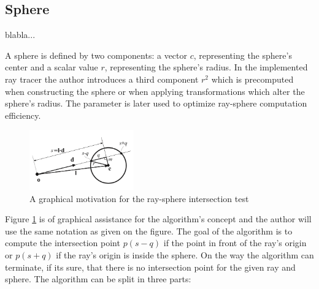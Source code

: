 \documentclass{article}
\begin{document}
\subsection{Sphere}

blabla...

\vspace*{\baselineskip}

A sphere is defined by two components: a vector $c$, representing the sphere's center and a scalar value $r$, representing the sphere's radius. In the implemented ray tracer the author introduces a third component $r^2$ which is precomputed when constructing the sphere or when applying transformations which alter the sphere's radius. The parameter is later used to optimize ray-sphere computation efficiency.

\begin{figure} 
    \centering
    \includegraphics[width=0.4\textwidth]{ray_sphere}
    \caption{A graphical motivation for the ray-sphere intersection test}
    \label{fig:raysphere}
\end{figure}

Figure \ref{fig:raysphere} is of graphical assistance for the algorithm's concept and the author will use the same notation as given on the figure. The goal of the algorithm is to compute the intersection point $p(s-q)$ if the point in front of the ray's origin or $p(s+q)$ if the ray's origin is inside the sphere. On the way the algorithm can terminate, if its sure, that there is no intersection point for the given ray and sphere. The algorithm can be split in three parts: \cite{realtime_ren}
\end{document}
